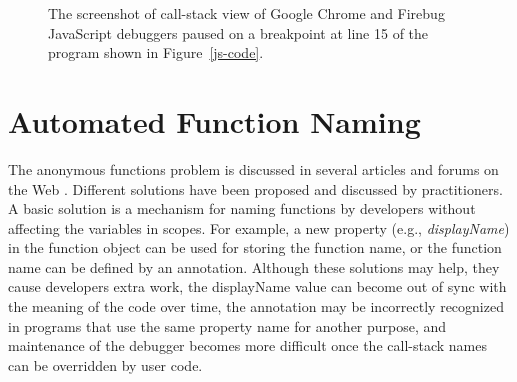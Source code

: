 \documentclass[10pt, preprint]{sigplanconf}
\begin{document}
\begin{figure}[htp]
\centerline{
\hfil
{}}
\caption{The screenshot of call-stack view of Google Chrome and Firebug JavaScript debuggers paused on a breakpoint at line 15 of the program shown in Figure~\ref{js-code}.}
\label{debuggers-callstack}
\end{figure}
 

\section{Automated Function Naming}
The anonymous functions problem is discussed in several articles and forums on the Web \cite{DisplayName, Zaytsev}. Different solutions have been proposed and discussed by practitioners. A basic solution is a mechanism for naming functions by developers without affecting the variables in scopes. For example, a new property (e.g., \textit{displayName}) in the function object can be used for storing the function name, or the function name can be defined by an annotation. Although these solutions may help, they cause developers extra work, the displayName value can become out of sync with the meaning of the code over time,  the annotation may be incorrectly recognized in programs that use the same property name for another purpose, and maintenance of the debugger becomes more difficult once the call-stack names can be overridden by user code.
\end{document}
